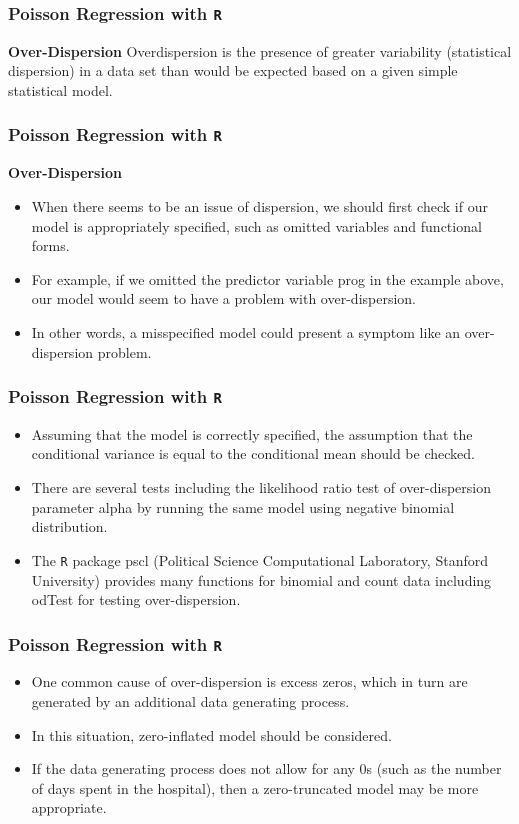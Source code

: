 \begin{frame}[fragile]

\frametitle{Poisson Regression with \texttt{R}}
\Large
\textbf{Over-Dispersion}
Overdispersion is the presence of greater variability
(statistical dispersion) in a data set than would be expected based on a given simple statistical model.
\end{frame}
\begin{frame}[fragile]

\frametitle{Poisson Regression with \texttt{R}}
\Large
\textbf{Over-Dispersion}
\begin{itemize}

 \item When there seems to be an issue of dispersion, we should first check if our model is appropriately specified, 
 such as omitted variables and functional forms. 
 \item For example, if we omitted the predictor variable prog in the example above, our model would seem to have a 
 problem with over-dispersion. 
 \item In other words, a misspecified model could present a symptom like an over-dispersion problem. 
\end{itemize}
\end{frame}
\begin{frame}[fragile]
\frametitle{Poisson Regression with \texttt{R}}
	\Large
\begin{itemize}
\item Assuming that the model is correctly specified, the assumption that the conditional variance is equal 
to the conditional mean should be checked. 
\item There are several tests including the likelihood ratio test of over-dispersion parameter alpha by running the 
same model using negative binomial distribution. 
\item The \texttt{R} package pscl (Political Science Computational Laboratory, Stanford University) provides many functions for binomial 
and count data including odTest for testing over-dispersion. 
\end{itemize}
\end{frame}
\begin{frame}[fragile]
	\frametitle{Poisson Regression with \texttt{R}}
	\Large
	\begin{itemize}
\item One common cause of over-dispersion is excess zeros, which in turn are generated by an additional data generating 
process. 
\item In this situation, zero-inflated model should be considered.
\item If the data generating process does not allow for any 0s (such as the number of days spent in the hospital), then a zero-truncated model may be more appropriate.
\end{itemize}
\end{frame}
